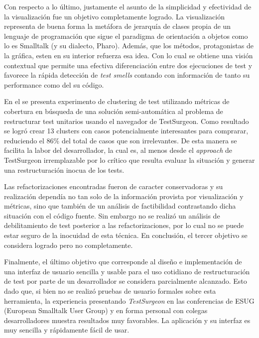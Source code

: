 \par Con respecto a lo último, justamente el asunto de la simplicidad y efectividad de la visualización fue un objetivo completamente logrado. La visualización representa de buena forma la metáfora de jerarquía de clases propia de un lenguaje de programación que sigue el paradigma de orientación a objetos como lo es Smalltalk (y su dialecto, Pharo). Además, que los métodos, protagonistas de la gráfica, esten en su interior refuerza esa idea. Con lo cual se obtiene una visión contextual que permite una efectiva diferenciación entre dos ejecuciones de test y favorece la rápida detección de \emph{test smells} contando con información de tanto su performance como del su código.

\par En el  se presenta experimento de clustering de test utilizando métricas de cobertura en búsqueda de una solución semi-automática al problema de restructurar test unitarios usando el navegador de TestSurgeon. Como resultado se logró crear 13 clusters con casos potencialmente interesantes para comprarar, reduciendo el 86\% del total de casos que son irrelevantes. De esta manera se facilita la labor del desarrollador, la cual es, al menos desde el \emph{approach} de TestSurgeon irremplazable por lo crítico que resulta evaluar la situación y generar una restructuración inocua de los tests.

\par Las refactorizaciones encontradas fueron de caracter conservadoras y su realización dependía no tan solo de la información provista por visualización y métricas, sino que también de un análisis de factibilidad contrastando dicha situación con el código fuente. Sin embargo no se realizó un análisis de debilitamiento de test posterior a las refactorizaciones, por lo cual no se puede estar seguro de la inocuidad de esta técnica. En conclusión, el tercer objetivo se considera logrado pero no completamente.

\par Finalmente, el último objetivo que corresponde al diseño e implementación de una interfaz de usuario sencilla y usable para el uso cotidiano de restructuración de test por parte de un desarrollador se considera parcialmente alcanzado. Esto dado que, si bien no se realizó pruebas de usuario formales sobre esta herramienta, la experiencia presentando \emph{TestSurgeon} en las conferencias de ESUG (European Smalltalk User Group) y en forma personal con colegas desarrolladores muestra resultados muy favorables. La aplicación y su interfaz es muy sencilla y rápidamente fácil de usar.

